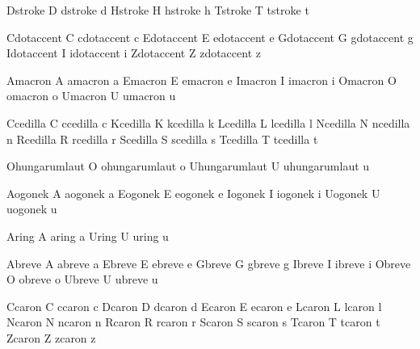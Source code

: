  Dstroke {D}  dstroke {d}
 Hstroke {H}  hstroke {h}
 Tstroke {T}  tstroke {t}

 Cdotaccent {C}  cdotaccent {c}
 Edotaccent {E}  edotaccent {e}
 Gdotaccent {G}  gdotaccent {g}
 Idotaccent {I}  idotaccent {i}
 Zdotaccent {Z}  zdotaccent {z}

 Amacron {A}  amacron {a}
 Emacron {E}  emacron {e}
 Imacron {I}  imacron {i}
 Omacron {O}  omacron {o}
 Umacron {U}  umacron {u}

 Ccedilla {C}  ccedilla {c}
 Kcedilla {K}  kcedilla {k}
 Lcedilla {L}  lcedilla {l}
 Ncedilla {N}  ncedilla {n}
 Rcedilla {R}  rcedilla {r}
 Scedilla {S}  scedilla {s}
 Tcedilla {T}  tcedilla {t}

 Ohungarumlaut {O}  ohungarumlaut {o}
 Uhungarumlaut {U}  uhungarumlaut {u}

 Aogonek {A}  aogonek {a}
 Eogonek {E}  eogonek {e}
 Iogonek {I}  iogonek {i}
 Uogonek {U}  uogonek {u}

 Aring {A}  aring {a}
 Uring {U}  uring {u}

 Abreve {A}  abreve {a}
 Ebreve {E}  ebreve {e}
 Gbreve {G}  gbreve {g}
 Ibreve {I}  ibreve {i}
 Obreve {O}  obreve {o}
 Ubreve {U}  ubreve {u}

 Ccaron {C}  ccaron {c}
 Dcaron {D}  dcaron {d}
 Ecaron {E}  ecaron {e}
 Lcaron {L}  lcaron {l}
 Ncaron {N}  ncaron {n}
 Rcaron {R}  rcaron {r}
 Scaron {S}  scaron {s}
 Tcaron {T}  tcaron {t}
 Zcaron {Z}  zcaron {z}

